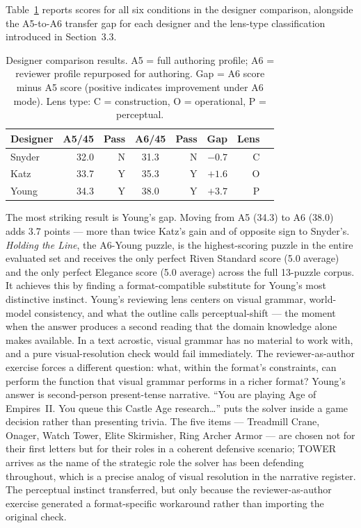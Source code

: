 Table~\ref{tab:designers} reports scores for all six conditions in the designer comparison, alongside the A5-to-A6 transfer gap for each designer and the lens-type classification introduced in Section~3.3.

\begin{table}[h]
\centering
\caption{Designer comparison results. A5 = full authoring profile; A6 = reviewer profile repurposed for authoring. Gap = A6 score minus A5 score (positive indicates improvement under A6 mode). Lens type: C = construction, O = operational, P = perceptual.}
\label{tab:designers}
\begin{tabular}{lrrcrrrc}
\toprule
Designer & A5/45 & Pass & A6/45 & Pass & Gap & Lens \\
\midrule
Snyder & 32.0 & N & 31.3 & N & $-0.7$ & C \\
Katz   & 33.7 & Y & 35.3 & Y & $+1.6$ & O \\
Young  & 34.3 & Y & 38.0 & Y & $+3.7$ & P \\
\bottomrule
\end{tabular}
\end{table}

The most striking result is Young's gap. Moving from A5 (34.3) to A6 (38.0) adds 3.7 points --- more than twice Katz's gain and of opposite sign to Snyder's. \textit{Holding the Line}, the A6-Young puzzle, is the highest-scoring puzzle in the entire evaluated set and receives the only perfect Riven Standard score (5.0 average) and the only perfect Elegance score (5.0 average) across the full 13-puzzle corpus. It achieves this by finding a format-compatible substitute for Young's most distinctive instinct. Young's reviewing lens centers on visual grammar, world-model consistency, and what the outline calls perceptual-shift --- the moment when the answer produces a second reading that the domain knowledge alone makes available. In a text acrostic, visual grammar has no material to work with, and a pure visual-resolution check would fail immediately. The reviewer-as-author exercise forces a different question: what, within the format's constraints, can perform the function that visual grammar performs in a richer format? Young's answer is second-person present-tense narrative. ``You are playing Age of Empires~II. You queue this Castle Age research\ldots'' puts the solver inside a game decision rather than presenting trivia. The five items --- Treadmill Crane, Onager, Watch Tower, Elite Skirmisher, Ring Archer Armor --- are chosen not for their first letters but for their roles in a coherent defensive scenario; TOWER arrives as the name of the strategic role the solver has been defending throughout, which is a precise analog of visual resolution in the narrative register. The perceptual instinct transferred, but only because the reviewer-as-author exercise generated a format-specific workaround rather than importing the original check.

